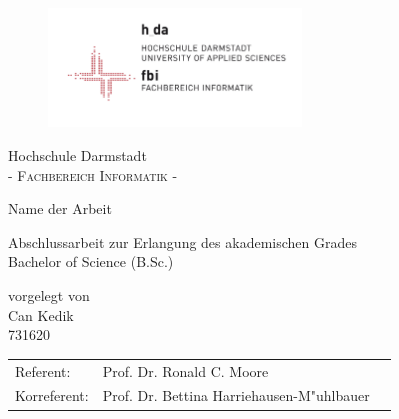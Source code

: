 \pagestyle{empty} %

\begin{figure}[t]
	\centering
	\includegraphics[width=0.6\textwidth]{Abb/logo_fbi}
\end{figure}


\begin{center}
\Large Hochschule Darmstadt \\
\normalsize \textsc{- Fachbereich Informatik -} \\

\vspace{105 pt}

\Huge Name der Arbeit \\ 
\normalsize
\vspace{20 pt}

Abschlussarbeit zur Erlangung des akademischen Grades \\ 
Bachelor of Science (B.Sc.) 

\vspace{75 pt}


vorgelegt von \\
\vspace{5 pt}
Can Kedik \\
731620
\vspace{115 pt}

\begin{tabular}[h]{p{4cm}l l}
	Referent: & Prof. Dr. Ronald C. Moore\\
	Korreferent: & Prof. Dr. Bettina Harriehausen-M"uhlbauer
\end{tabular}


\end{center}
